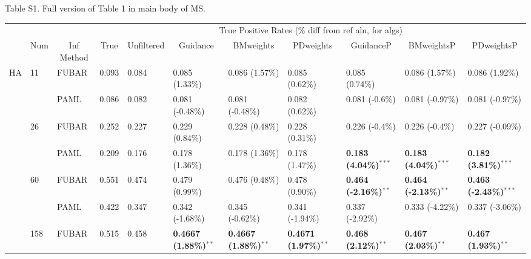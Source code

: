 \documentclass[11pt]{article}
\begin{document}
\noindent Table S1. Full version of Table 1 in main body of MS.
\begin{sidewaystable}[htbp]
\begin{adjustwidth}{-2.25cm}{}
\begin{tabular}{l l l l l l l l l l l}
\hline\noalign{\smallskip}
& & & \multicolumn{8}{c}{True Positive Rates (\% diff from ref aln, for algs)} \\
\cline{4-11}\noalign{\smallskip}
\multicolumn{1}{c}{Profile} & \multicolumn{1}{c}{Num} & \multicolumn{1}{c}{Inf Method} & \multicolumn{1}{c}{True} & \multicolumn{1}{c}{Unfiltered} & \multicolumn{1}{c}{Guidance} & \multicolumn{1}{c}{BMweights} & \multicolumn{1}{c}{PDweights} & \multicolumn{1}{c}{GuidanceP} & \multicolumn{1}{c}{BMweightsP} & \multicolumn{1}{c}{PDweightsP} \\
\noalign{\smallskip}\hline\noalign{\smallskip}
HA  &  11  &  FUBAR  &  0.093  &  0.084  &  0.085 (1.33\%)  &  0.086 (1.57\%)  &  0.085 (0.62\%)  &  0.085 (0.74\%)  &  0.086 (1.57\%)  &  0.086 (1.92\%)  \\
  &    &  PAML       &  0.086  &  0.082  &  0.081 (-0.48\%)  &  0.081 (-0.48\%)  &  0.082 (0.62\%)  &  0.081 (-0.6\%)  &  0.081 (-0.97\%)  &  0.081 (-0.97\%)  \\
\hline
  &  26  &  FUBAR    &  0.252  &  0.227  &  0.229 (0.84\%)  &  0.228 (0.48\%)  &  0.228 (0.31\%)  &  0.226 (-0.4\%)  &  0.226 (-0.4\%)  &  0.227 (-0.09\%)  \\
  &    &  PAML       &  0.209  &  0.176  &  0.178 (1.36\%)  & 0.178 (1.36\%)  &  0.178 (1.47\%)  &  \textbf{0.183 (4.04\%)}$^{\ast\ast\ast}$  &  \textbf{0.183 (4.04\%)}$^{\ast\ast\ast}$  &  \textbf{0.182 (3.81\%)}$^{\ast\ast\ast}$  \\
\hline
  &  60  &  FUBAR    &  0.551  &  0.474  &  0.479 (0.99\%)  &  0.476 (0.48\%)  &  0.478 (0.90\%)  &  \textbf{0.464 (-2.16\%)}$^{\ast\ast}$  &  \textbf{0.464 (-2.13\%)}$^{\ast\ast}$  &  \textbf{0.463 (-2.43\%)}$^{\ast\ast\ast}$  \\
  &    &  PAML       &  0.422  &  0.347  &  0.342 (-1.68\%)  &  0.345 (-0.62\%)  &  0.341 (-1.94\%)  &  0.337 (-2.92\%)  &  0.333 (-4.22\%)  &  0.337 (-3.06\%)  \\
\hline
  &  158  &  FUBAR   &  0.515  &  0.458  & \textbf{0.4667 (1.88\%)}$^{\ast\ast}$  &  \textbf{0.4667 (1.88\%)}$^{\ast\ast}$  &  \textbf{0.4671 (1.97\%)}$^{\ast\ast}$  &  \textbf{0.468 (2.12\%)}$^{\ast\ast}$  &  \textbf{0.467 (2.03\%)}$^{\ast\ast}$  &  \textbf{0.467 (1.93\%)}$^{\ast\ast}$  \\
\hline

\end{tabular}
\end{adjustwidth}
\end{sidewaystable}
\end{document}
